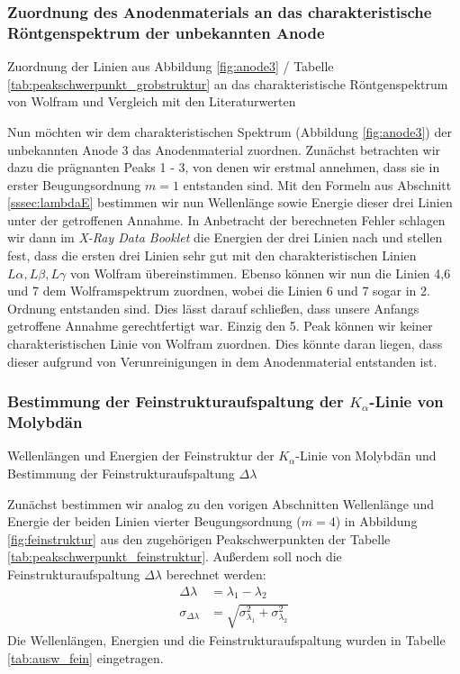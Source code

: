 \documentclass[10pt, a4paper]{article}
\begin{document}
\subsubsection{Zuordnung des Anodenmaterials an das charakteristische Röntgenspektrum der unbekannten Anode}
\begin{table}[h]
\centering

\caption{Zuordnung der Linien aus Abbildung \ref{fig:anode3} / Tabelle \ref{tab:peakschwerpunkt_grobstruktur} an das charakteristische Röntgenspektrum von Wolfram und Vergleich mit den Literaturwerten}
\label{tab:ausw_grob}
\end{table}
Nun möchten wir dem charakteristischen Spektrum (Abbildung \ref{fig:anode3}) der unbekannten Anode 3 das Anodenmaterial zuordnen.
Zunächst betrachten wir dazu die prägnanten Peaks 1 - 3, von denen wir erstmal annehmen, dass sie in erster Beugungsordnung $m = 1$ entstanden sind.
Mit den Formeln aus Abschnitt \ref{sssec:lambdaE} bestimmen wir nun Wellenlänge sowie Energie dieser drei Linien unter der getroffenen Annahme.
In Anbetracht der berechneten Fehler schlagen wir dann im \emph{X-Ray Data Booklet} \cite{booklet} die Energien der drei Linien nach und stellen fest, dass die ersten drei Linien sehr gut mit den charakteristischen Linien $L\alpha, L\beta, L\gamma$ von Wolfram übereinstimmen.
Ebenso können wir nun die Linien 4,6 und 7 dem Wolframspektrum zuordnen, wobei die Linien 6 und 7 sogar in 2. Ordnung entstanden sind.
Dies lässt darauf schließen, dass unsere Anfangs getroffene Annahme gerechtfertigt war.
Einzig den 5. Peak können wir keiner charakteristischen Linie von Wolfram zuordnen.
Dies könnte daran liegen, dass dieser aufgrund von Verunreinigungen in dem Anodenmaterial entstanden ist.

\subsubsection{Bestimmung der Feinstrukturaufspaltung der $K_\alpha$-Linie von Molybdän}
\begin{table}[h]
\centering

\caption{Wellenlängen und Energien der Feinstruktur der $K_\alpha$-Linie von Molybdän und Bestimmung der Feinstrukturaufspaltung $\Delta \lambda$}
\label{tab:ausw_fein}
\end{table}
Zunächst bestimmen wir analog zu den vorigen Abschnitten Wellenlänge und Energie der beiden Linien vierter Beugungsordnung ($m=4$) in Abbildung \ref{fig:feinstruktur} aus den zugehörigen Peakschwerpunkten der Tabelle \ref{tab:peakschwerpunkt_feinstruktur}.
Außerdem soll noch die Feinstrukturaufspaltung $\Delta \lambda$ berechnet werden:
\begin{align}
  \Delta \lambda &= \lambda_1 - \lambda_2 \\
  \sigma_{\Delta \lambda} &= \sqrt{\sigma_{\lambda_1}^2 + \sigma_{\lambda_2}^2}
\end{align}
Die Wellenlängen, Energien und die Feinstrukturaufspaltung wurden in Tabelle \ref{tab:ausw_fein} eingetragen.
\end{document}
